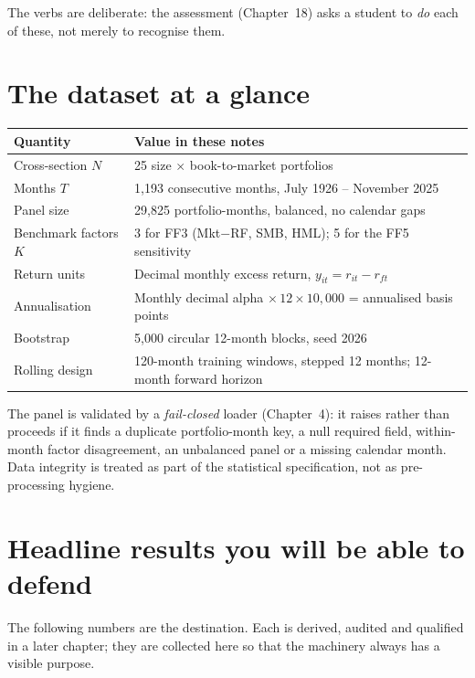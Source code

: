 The verbs are deliberate: the assessment (Chapter~18) asks a student to
\emph{do} each of these, not merely to recognise them.

\hypertarget{the-dataset-at-a-glance}{%
\section{The dataset at a glance}\label{the-dataset-at-a-glance}}

\begin{longtable}[]{@{}p{}p{}@{}}
\toprule\noalign{}
Quantity & Value in these notes \\
\midrule\noalign{}
\endhead
\bottomrule\noalign{}
\endlastfoot
Cross-section $N$ & 25 size $\times$ book-to-market portfolios \\
Months $T$ & 1{,}193 consecutive months, July 1926 -- November 2025 \\
Panel size & 29{,}825 portfolio-months, balanced, no calendar gaps \\
Benchmark factors $K$ & 3 for FF3 (Mkt$-$RF, SMB, HML); 5 for the FF5 sensitivity \\
Return units & Decimal monthly excess return, $y_{it}=r_{it}-r_{ft}$ \\
Annualisation & Monthly decimal alpha $\times\,12\times10{,}000$ = annualised basis points \\
Bootstrap & 5{,}000 circular 12-month blocks, seed 2026 \\
Rolling design & 120-month training windows, stepped 12 months; 12-month forward horizon \\
\end{longtable}

The panel is validated by a \emph{fail-closed} loader (Chapter~4): it
raises rather than proceeds if it finds a duplicate portfolio-month key,
a null required field, within-month factor disagreement, an unbalanced
panel or a missing calendar month. Data integrity is treated as part of
the statistical specification, not as pre-processing hygiene.

\hypertarget{headline-results-you-will-be-able-to-defend}{%
\section{Headline results you will be able to
defend}\label{headline-results-you-will-be-able-to-defend}}

The following numbers are the destination. Each is derived, audited and
qualified in a later chapter; they are collected here so that the
machinery always has a visible purpose.

